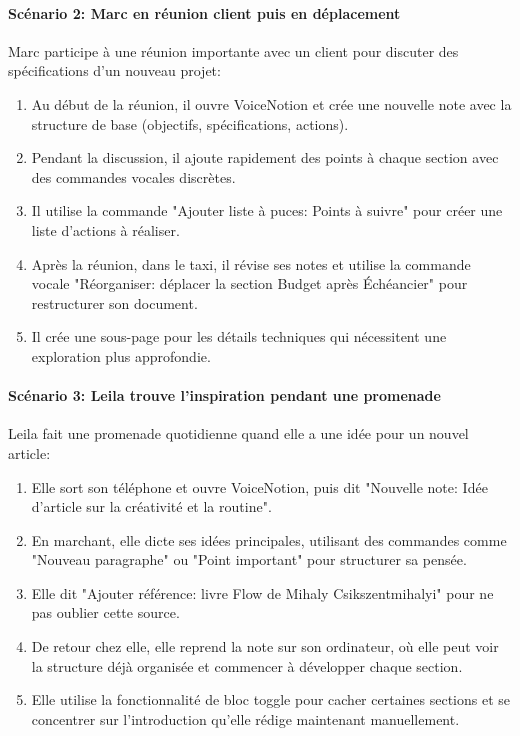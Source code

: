 \paragraph{Scénario 2: Marc en réunion client puis en déplacement}

Marc participe à une réunion importante avec un client pour discuter des spécifications d'un nouveau projet:
\begin{enumerate}
    \item Au début de la réunion, il ouvre VoiceNotion et crée une nouvelle note avec la structure de base (objectifs, spécifications, actions).
    \item Pendant la discussion, il ajoute rapidement des points à chaque section avec des commandes vocales discrètes.
    \item Il utilise la commande "Ajouter liste à puces: Points à suivre" pour créer une liste d'actions à réaliser.
    \item Après la réunion, dans le taxi, il révise ses notes et utilise la commande vocale "Réorganiser: déplacer la section Budget après Échéancier" pour restructurer son document.
    \item Il crée une sous-page pour les détails techniques qui nécessitent une exploration plus approfondie.
\end{enumerate}

\paragraph{Scénario 3: Leila trouve l'inspiration pendant une promenade}

Leila fait une promenade quotidienne quand elle a une idée pour un nouvel article:
\begin{enumerate}
    \item Elle sort son téléphone et ouvre VoiceNotion, puis dit "Nouvelle note: Idée d'article sur la créativité et la routine".
    \item En marchant, elle dicte ses idées principales, utilisant des commandes comme "Nouveau paragraphe" ou "Point important" pour structurer sa pensée.
    \item Elle dit "Ajouter référence: livre Flow de Mihaly Csikszentmihalyi" pour ne pas oublier cette source.
    \item De retour chez elle, elle reprend la note sur son ordinateur, où elle peut voir la structure déjà organisée et commencer à développer chaque section.
    \item Elle utilise la fonctionnalité de bloc toggle pour cacher certaines sections et se concentrer sur l'introduction qu'elle rédige maintenant manuellement.
\end{enumerate}

